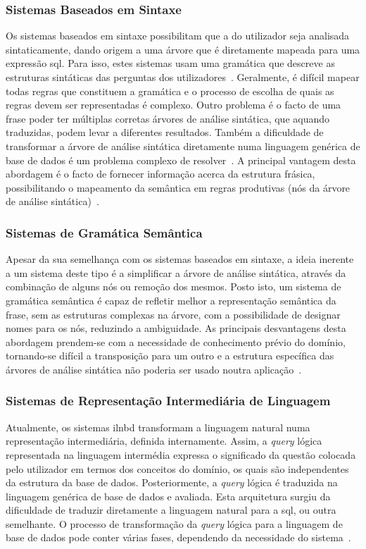 \subsubsection*{Sistemas Baseados em Sintaxe}
Os sistemas baseados em sintaxe possibilitam que a  do utilizador seja analisada sintaticamente, dando origem a uma árvore que é diretamente mapeada para uma expressão \gls{sql}. Para isso, estes sistemas usam uma gramática que descreve as estruturas sintáticas das perguntas dos utilizadores~\parencite{nlidb_brief_review}. Geralmente, é difícil mapear todas regras que constituem a gramática e o processo de escolha de quais as regras devem ser representadas é complexo. Outro problema é o facto de uma frase poder ter múltiplas corretas árvores de análise sintática, que aquando traduzidas, podem levar a diferentes resultados. Também a dificuldade de transformar a árvore de análise sintática diretamente numa linguagem genérica de base de dados é um problema complexo de resolver~\parencite{survey_nlidb}. A principal vantagem desta abordagem é o facto de fornecer informação acerca da estrutura frásica, possibilitando o mapeamento da semântica em regras produtivas (nós da árvore de análise sintática)~\parencite{nlidb_brief_review}.

\subsubsection*{Sistemas de Gramática Semântica}
Apesar da sua semelhança com os sistemas baseados em sintaxe, a ideia inerente a um sistema deste tipo é a simplificar a árvore de análise sintática, através da combinação de alguns nós ou remoção dos mesmos. Posto isto, um sistema de gramática semântica é capaz de refletir melhor a representação semântica da frase, sem as estruturas complexas na árvore, com a possibilidade de designar nomes para os nós, reduzindo a ambiguidade. As principais desvantagens desta abordagem prendem-se com a necessidade de conhecimento prévio do domínio, tornando-se difícil a transposição para um outro e a estrutura específica das árvores de análise sintática não poderia ser usado noutra aplicação~\parencite{survey_nlidb, nlidb_brief_review}.

\subsubsection*{Sistemas de Representação Intermediária de Linguagem}
Atualmente, os sistemas \gls{ilnbd} transformam a linguagem natural numa representação intermediária, definida internamente. Assim, a \textit{query} lógica representada na linguagem intermédia expressa o significado da questão colocada pelo utilizador em termos dos conceitos do domínio, os quais são independentes da estrutura da base de dados. Posteriormente, a \textit{query} lógica é traduzida na linguagem genérica de base de dados e avaliada. Esta arquitetura surgiu da dificuldade de traduzir diretamente a linguagem natural para a \gls{sql}, ou outra semelhante. O processo de transformação da \textit{query} lógica para a linguagem de base de dados pode conter várias fases, dependendo da necessidade do sistema~\parencite{nlidb_brief_review}.

